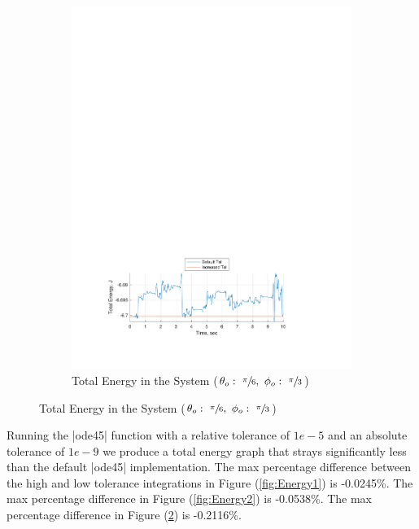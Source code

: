 \documentclass[12pt]{report}
\begin{document}
\begin{flushleft}
\begin{figure}[!ht] \ContinuedFloat
\begin{subfigure}[t]{\textwidth}
  \includegraphics[center]{Energy3}
  \caption{Total Energy in the System ($\theta_o:~\sfrac{\pi}{6},~\phi_o:~\sfrac{\pi}{3}$)}
  \label{fig:Energy3}
\end{subfigure}
\end{figure}
\newpage
\null
\newpage
\flushleft
Running the |ode45| function with a relative tolerance of $1e-5$ and an absolute
tolerance of $1e-9$ we produce a total energy graph that strays significantly
less than the default |ode45| implementation. The max percentage difference between
the high and low tolerance integrations in Figure (\ref{fig:Energy1}) is -0.0245\%.
The max percentage difference in Figure (\ref{fig:Energy2}) is
-0.0538\%. The max percentage difference in Figure (\ref{fig:Energy3}) is
-0.2116\%.

\newpage

\end{flushleft}
\end{document}
